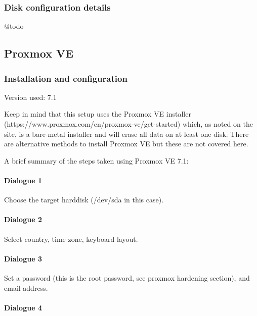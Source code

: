 \documentclass[
	11pt, %
	fleqn, %
	a4paper, %
]{LegrandOrangeBook}
\begin{document}
\hypertarget{disk-configuration-details}{%
\subsubsection{Disk configuration
details}\label{disk-configuration-details}}

@todo

\hypertarget{proxmox-ve}{%
\subsection{Proxmox VE}\label{proxmox-ve}}

\hypertarget{installation-and-configuration}{%
\subsubsection{Installation and
configuration}\label{installation-and-configuration}}

Version used: 7.1

Keep in mind that this setup uses the Proxmox VE installer
(https://www.proxmox.com/en/proxmox-ve/get-started) which, as noted on
the site, is a bare-metal installer and will erase all data on at least
one disk. There are alternative methods to install Proxmox VE but these
are not covered here.

A brief summary of the steps taken using Proxmox VE 7.1:

\hypertarget{dialogue-1}{%
\paragraph{Dialogue 1}\label{dialogue-1}}

Choose the target harddisk (/dev/sda in this case).

\hypertarget{dialogue-2}{%
\paragraph{Dialogue 2}\label{dialogue-2}}

Select country, time zone, keyboard layout.

\hypertarget{dialogue-3}{%
\paragraph{Dialogue 3}\label{dialogue-3}}

Set a password (this is the root password, see proxmox hardening
section), and email address.

\hypertarget{dialogue-4}{%
\paragraph{Dialogue 4}\label{dialogue-4}}
\end{document}
